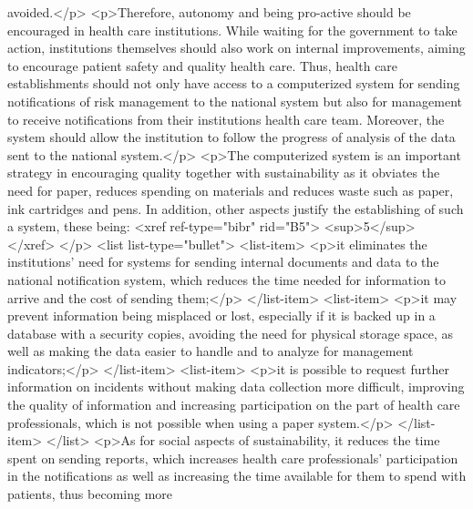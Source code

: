            avoided.</p>
          <p>Therefore, autonomy and being pro-active should be encouraged in health care
            institutions. While waiting for the government to take action, institutions themselves
            should also work on internal improvements, aiming to encourage patient safety and
            quality health care. Thus, health care establishments should not only have access to a
            computerized system for sending notifications of risk management to the national system
            but also for management to receive notifications from their institutions health care
            team. Moreover, the system should allow the institution to follow the progress of
            analysis of the data sent to the national system.</p>
          <p>The computerized system is an important strategy in encouraging quality together with
            sustainability as it obviates the need for paper, reduces spending on materials and
            reduces waste such as paper, ink cartridges and pens. In addition, other aspects justify
            the establishing of such a system, these being: <xref ref-type="bibr" rid="B5">
              <sup>5</sup>
            </xref>
          </p>
          <list list-type="bullet">
            <list-item>
              <p>it eliminates the institutions’ need for systems for sending internal documents and
                data to the national notification system, which reduces the time needed for
                information to arrive and the cost of sending them;</p>
            </list-item>
            <list-item>
              <p>it may prevent information being misplaced or lost, especially if it is backed up
                in a database with a security copies, avoiding the need for physical storage space,
                as well as making the data easier to handle and to analyze for management
                indicators;</p>
            </list-item>
            <list-item>
              <p>it is possible to request further information on incidents without making data
                collection more difficult, improving the quality of information and increasing
                participation on the part of health care professionals, which is not possible when
                using a paper system.</p>
            </list-item>
          </list>
          <p>As for social aspects of sustainability, it reduces the time spent on sending reports,
            which increases health care professionals’ participation in the notifications as well as
            increasing the time available for them to spend with patients, thus becoming more
